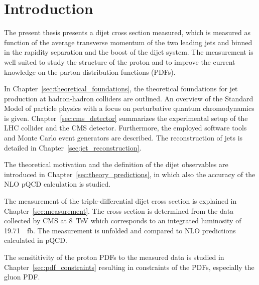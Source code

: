 
\chapter{Introduction}





The present thesis presents a dijet cross section measured, which is measured as
function of the average transverse momentum of the two leading jets and binned
in the rapidity separation and the boost of the dijet system. The measurement is
well suited to study the structure of the proton and to improve the current
knowledge on the parton distribution functions (PDFs). 

In Chapter~\ref{sec:theoretical_foundations}, the theoretical foundations for
jet production at hadron-hadron colliders are outlined. An overview of the
Standard Model of particle physics with a focus on perturbative quantum
chromodynamics is given. Chapter~\ref{sec:cms_detector} summarizes the
experimental setup of the LHC collider and the CMS detector. Furthermore, the
employed software tools and Monte Carlo event generators are described. The
reconstruction of jets is detailed in Chapter~\ref{sec:jet_reconstruction}.

The theoretical motivation and the definition of the dijet observables are
introduced in Chapter~\ref{sec:theory_predictions}, in which also the accuracy
of the NLO pQCD calculation is studied. 

The measurement of the triple-differential dijet cross section is explained in
Chapter~\ref{sec:measurement}. The cross section is determined from the data
collected by CMS at \SI{8}{\TeV} which corresponds to an integrated luminosity
of \SI{19.71}{\per \femto \barn}. The measurement is unfolded and compared to
NLO predictions calculated in pQCD.

The sensititivity of the proton PDFs to the measured data is studied in
Chapter~\ref{sec:pdf_constraints} resulting in constraints of the PDFs,
especially the gluon PDF.
